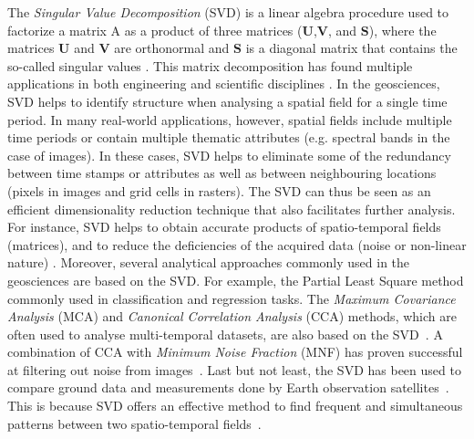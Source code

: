 \documentclass[ijgi,article,submit,moreauthors,pdftex,10pt,a4paper]{Definitions/mdpi}
\def\U{{\mathbf U}}
\def\V{{\mathbf V}}
\def\S{{\mathbf S}}
\begin{document}
The \textit{Singular Value Decomposition} (SVD) is a linear algebra procedure used to factorize a matrix A as a product of three matrices ($\U$,$\V$,
and $\S$), where the matrices $\U$ and $\V$ are orthonormal and $\S$ is a diagonal matrix that contains the so-called singular values \cite{golub70}.
This matrix decomposition has found multiple applications in both engineering and scientific disciplines \cite{Rajwade13,khoshbin16,meuwissen17}. In
the geosciences,  SVD helps to identify structure when analysing a spatial field for a single time period. In many real-world applications, however,
spatial fields include multiple time periods or contain multiple thematic attributes (e.g. spectral bands in the case of images). In these cases, SVD
helps to eliminate some of the redundancy between time stamps or attributes as well as between neighbouring locations (pixels in images and grid cells
in rasters). The SVD can thus be seen as an efficient dimensionality reduction technique that also facilitates further analysis. For instance, SVD
helps to obtain accurate products of spatio-temporal fields (matrices), and to reduce the deficiencies of the acquired data (noise or non-linear
nature) \cite{izquierdo17}. Moreover, several analytical approaches commonly used in the geosciences are based on the SVD. For example, the Partial
Least Square method commonly used in classification \cite{izquierdo14} and regression \cite{hansen03} tasks. The \textit{Maximum Covariance Analysis}
(MCA) and \textit{Canonical Correlation Analysis} (CCA) methods, which are often used to analyse multi-temporal datasets, are also based on the
SVD~\cite{munoz13}. A combination of CCA with \textit{Minimum Noise Fraction} (MNF) has proven successful at filtering out noise from
images~\cite{nielsen07}. Last but not least, the SVD has been used to compare ground data and measurements done by Earth observation
satellites~\cite{li14, li14b}. This is because SVD offers an effective method to find frequent and simultaneous patterns between two spatio-temporal
fields~\cite{Eshel2011, Storch1999}.
\end{document}
